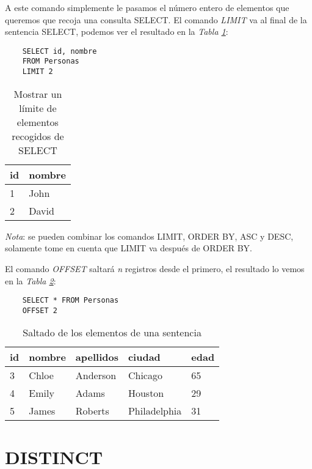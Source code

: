 A este comando simplemente le pasamos el número entero de elementos que queremos que recoja una consulta SELECT. El comando \textit{LIMIT} va al final de la sentencia SELECT, podemos ver el resultado en la \textit{Tabla \ref{tab: 5}}:
\begin{lstlisting}
    SELECT id, nombre
    FROM Personas
    LIMIT 2
\end{lstlisting}
\begin{table}[H]
    \centering
    \caption{Mostrar un límite de elementos recogidos de SELECT}
    \label{tab: 5}
    \begin{tabular}{|l|l|}
        \hline
        \textbf{id} & \textbf{nombre} \\
        \hline
        1 & John \\
        \hline
        2 & David \\
        \hline
    \end{tabular}
\end{table}

\textit{Nota}: se pueden combinar los comandos LIMIT, ORDER BY, ASC y DESC, solamente tome en cuenta que LIMIT va después de ORDER BY.

El comando \textit{OFFSET} saltará \textit{n} registros desde el primero, el resultado lo vemos en la \textit{Tabla \ref{tab: 6}}:
\begin{lstlisting}
    SELECT * FROM Personas
    OFFSET 2
\end{lstlisting}
\begin{table}[H]
    \centering
    \caption{Saltado de los elementos de una sentencia}
    \label{tab: 6}
    \begin{tabular}{|l|l|l|l|l|}
        \hline
        \textbf{id} & \textbf{nombre} & \textbf{apellidos} & \textbf{ciudad} & \textbf{edad} \\
        \hline
        3 & Chloe   & Anderson  & Chicago       & 65 \\
        \hline
        4 & Emily   & Adams     & Houston       & 29 \\
        \hline
        5 & James   & Roberts   & Philadelphia  & 31 \\
        \hline
    \end{tabular}
\end{table}



\section{DISTINCT}

